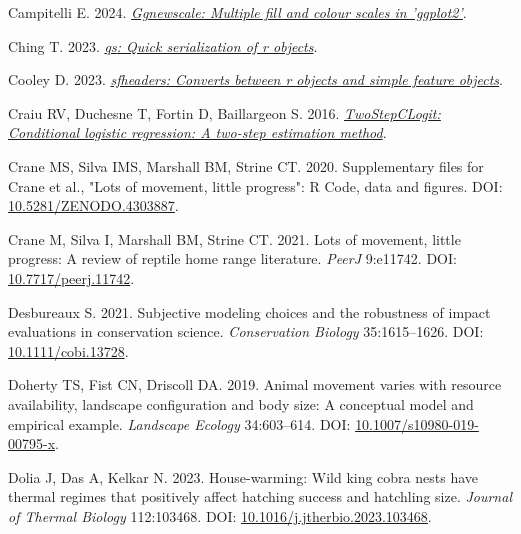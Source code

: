 \documentclass[10pt,a4paper]{article}
\newlength{\cslhangindent}
\newenvironment{CSLReferences}[2] %
 {\begin{list}{}{%
  \setlength{\itemindent}{0pt}
  \setlength{\leftmargin}{0pt}
  \setlength{\parsep}{0pt}
  \ifodd #1
   \setlength{\leftmargin}{\cslhangindent}
   \setlength{\itemindent}{-1\cslhangindent}
  \fi
  \setlength{\itemsep}{#2\baselineskip}}}
 {\end{list}}
\begin{document}
\begin{CSLReferences}{1}{0}
Campitelli E. 2024. \emph{\href{https://CRAN.R-project.org/package=ggnewscale}{Ggnewscale: Multiple fill and colour scales in 'ggplot2'}}.

Ching T. 2023. \emph{\href{https://CRAN.R-project.org/package=qs}{{qs}: Quick serialization of r objects}}.

Cooley D. 2023. \emph{\href{https://CRAN.R-project.org/package=sfheaders}{{sfheaders}: Converts between r objects and simple feature objects}}.

Craiu RV, Duchesne T, Fortin D, Baillargeon S. 2016. \emph{\href{https://CRAN.R-project.org/package=TwoStepCLogit}{TwoStepCLogit: Conditional logistic regression: A two-step estimation method}}.

Crane MS, Silva IMS, Marshall BM, Strine CT. 2020. Supplementary files for {Crane} et al., "{Lots} of movement, little progress": {R} {Code}, data and figures. DOI: \href{https://doi.org/10.5281/ZENODO.4303887}{10.5281/ZENODO.4303887}.

Crane M, Silva I, Marshall BM, Strine CT. 2021. Lots of movement, little progress: A review of reptile home range literature. \emph{PeerJ} 9:e11742. DOI: \href{https://doi.org/10.7717/peerj.11742}{10.7717/peerj.11742}.

Desbureaux S. 2021. Subjective modeling choices and the robustness of impact evaluations in conservation science. \emph{Conservation Biology} 35:1615--1626. DOI: \href{https://doi.org/10.1111/cobi.13728}{10.1111/cobi.13728}.

Doherty TS, Fist CN, Driscoll DA. 2019. Animal movement varies with resource availability, landscape configuration and body size: A conceptual model and empirical example. \emph{Landscape Ecology} 34:603--614. DOI: \href{https://doi.org/10.1007/s10980-019-00795-x}{10.1007/s10980-019-00795-x}.

Dolia J, Das A, Kelkar N. 2023. House-warming: {Wild} king cobra nests have thermal regimes that positively affect hatching success and hatchling size. \emph{Journal of Thermal Biology} 112:103468. DOI: \href{https://doi.org/10.1016/j.jtherbio.2023.103468}{10.1016/j.jtherbio.2023.103468}.


\end{CSLReferences}
\end{document}
